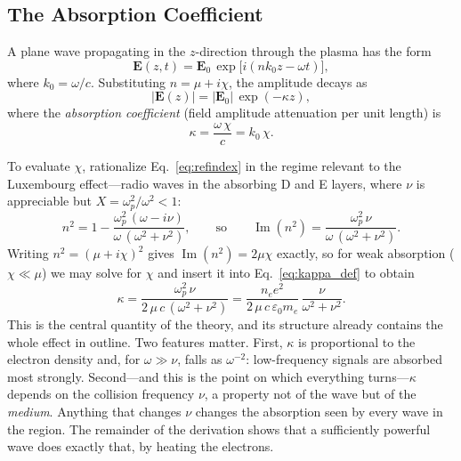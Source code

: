 \documentclass[12pt]{article}
\begin{document}
\subsection{The Absorption Coefficient}
\label{sec:absorption}

A plane wave propagating in the $z$-direction through the plasma has the form
\begin{equation}
  \mathbf{E}(z,t) = \mathbf{E}_0 \,\exp\bigl[i(nk_0 z - \omega t)\bigr],
\end{equation}
where $k_0 = \omega/c$.  Substituting $n = \mu + i\chi$, the amplitude decays as
\begin{equation}
  |\mathbf{E}(z)| = |\mathbf{E}_0|\,\exp(-\kappa z),
  \label{eq:decay}
\end{equation}
where the \emph{absorption coefficient} (field amplitude attenuation per unit length) is
\begin{equation}
  \kappa = \frac{\omega\,\chi}{c} = k_0\,\chi.
  \label{eq:kappa_def}
\end{equation}

To evaluate $\chi$, rationalize Eq.~\eqref{eq:refindex} in the regime relevant to the
Luxembourg effect---radio waves in the absorbing D and E layers, where $\nu$ is appreciable
but $X = \omega_p^2/\omega^2 < 1$:
\begin{equation}
  n^2 = 1 - \frac{\omega_p^2\,(\omega - i\nu)}{\omega\,(\omega^2 + \nu^2)},
  \qquad\text{so}\qquad
  \operatorname{Im}(n^2) = \frac{\omega_p^2\,\nu}{\omega\,(\omega^2+\nu^2)}.
\end{equation}
Writing $n^2 = (\mu+i\chi)^2$ gives $\operatorname{Im}(n^2) = 2\mu\chi$ exactly, so for
weak absorption ($\chi \ll \mu$) we may solve for $\chi$ and insert it into
Eq.~\eqref{eq:kappa_def} to obtain
\begin{equation}
  \boxed{
  \kappa = \frac{\omega_p^2\,\nu}{2\,\mu\,c\,(\omega^2 + \nu^2)}
         = \frac{n_e e^2}{2\,\mu\,c\,\varepsilon_0 m_e}\,
           \frac{\nu}{\omega^2+\nu^2}.
  }
  \label{eq:kappa}
\end{equation}
This is the central quantity of the theory, and its structure already contains the whole
effect in outline.  Two features matter.  First, $\kappa$ is proportional to the electron
density and, for $\omega \gg \nu$, falls as $\omega^{-2}$: low-frequency signals are
absorbed most strongly.  Second---and this is the point on which everything turns---$\kappa$
depends on the collision frequency $\nu$, a property not of the wave but of the
\emph{medium}.  Anything that changes $\nu$ changes the absorption seen by every wave in the
region.  The remainder of the derivation shows that a sufficiently powerful wave does
exactly that, by heating the electrons.
\end{document}

